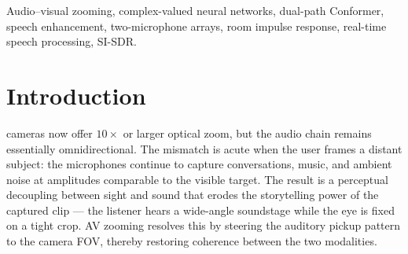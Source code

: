 \documentclass[journal,10pt]{IEEEtran}
\begin{document}
\begin{abstract}
\noindent Audio-visual (AV) zooming aligns the auditory field of view with that of a camera by enhancing sound sources within the visual frustum and suppressing off-axis interference. On consumer smartphones, this task is severely constrained: only two closely spaced microphones are typically available, strict latency budgets apply, and reverberation distorts the spatial cues upon which classical beamforming relies. We present a complete mathematical and algorithmic specification of a lightweight (\(\sim\!10\)\,M parameters) direction-conditioned enhancement network, the DCCRN--Conformer, designed to address these constraints. Operating entirely in the complex short-time Fourier transform (STFT) domain, the system utilizes a complex-valued encoder-decoder to preserve the inter-channel phase differences (IPD) that carry crucial direction-of-arrival information. A dual-path Conformer bottleneck performs joint frequency- and time-axis modeling to resolve spatial aliasing and reverberation, while a unit-circle azimuth embedding is fused multiplicatively with the bottleneck magnitude to execute phase-preserving spatial gating. On a highly reverberant test set of \(5{,}000\) mixtures (\(RT_{60}=0.5\,\mathrm{s}\), \(\mathrm{SIR}=0\,\mathrm{dB}\), \(\mathrm{SNR}=5\,\mathrm{dB}\)), the proposed system improves SI-SDR by \(40.14\,\mathrm{dB}\), STOI by \(0.214\), and PESQ by \(1.28\) over the unprocessed mixture, operating at \(\sim\!59\!\times\) real time on a CPU. 
\end{abstract}

\begin{IEEEkeywords}
Audio--visual zooming, complex-valued neural networks, dual-path Conformer, speech enhancement, two-microphone arrays, room impulse response, real-time speech processing, SI-SDR.
\end{IEEEkeywords}

\section{Introduction}
\label{sec:intro}
 cameras now offer \(10\!\times\) or larger optical zoom, but the audio chain remains essentially omnidirectional. The mismatch is acute when the user frames a distant subject: the microphones continue to capture conversations, music, and ambient noise at amplitudes comparable to the visible target. The result is a perceptual decoupling between sight and sound that erodes the storytelling power of the captured clip --- the listener hears a wide-angle soundstage while the eye is fixed on a tight crop. AV zooming \cite{nair2019audiovisual,spcup2026} resolves this by steering the auditory pickup pattern to the camera FOV, thereby restoring coherence between the two modalities.
\end{document}
